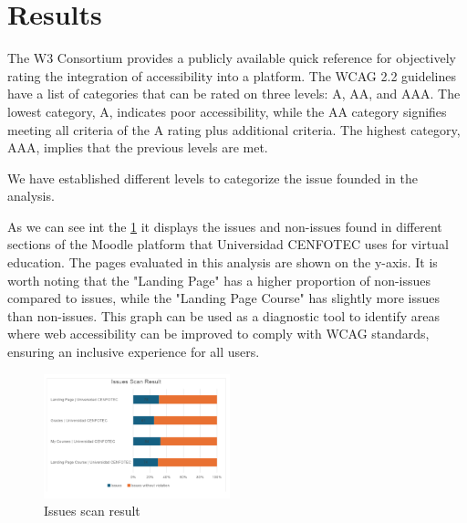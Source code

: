 \documentclass{IEEEtran}
\begin{document}
\section{Results}
The W3 Consortium provides a publicly available quick reference for objectively rating the integration of accessibility into a platform. The WCAG 2.2 guidelines have a list of categories that can be rated on three levels: A, AA, and AAA. The lowest category, A, indicates poor accessibility, while the AA category signifies meeting all criteria of the A rating plus additional criteria. The highest category, AAA, implies that the previous levels are met.

We have established different levels to categorize the issue founded in the analysis.

As we can see int the \ref{fig:figure3} it displays the issues and non-issues found in different sections of the Moodle platform that Universidad CENFOTEC uses for virtual education. The pages evaluated in this analysis are shown on the y-axis. It is worth noting that the "Landing Page" has a higher proportion of non-issues compared to issues, while the "Landing Page Course" has slightly more issues than non-issues. This graph can be used as a diagnostic tool to identify areas where web accessibility can be improved to comply with WCAG standards, ensuring an inclusive experience for all users.

\begin{figure}[H]
    \includegraphics[width=0.48\textwidth]{images/scanResult.png}
    \caption{Issues scan result}
    \label{fig:figure3}
\end{figure}
\end{document}

